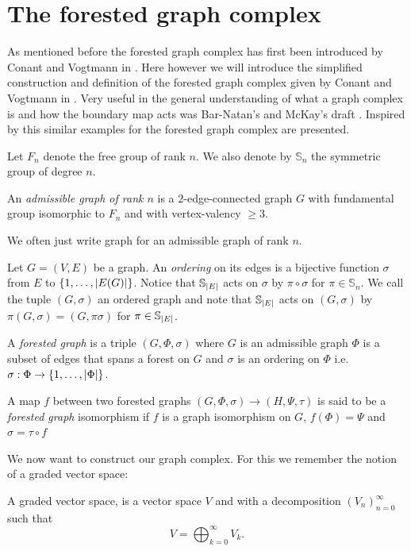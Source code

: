 \section{The forested graph complex}
As mentioned before the forested graph complex has first been introduced by Conant and Vogtmann in \cite{conant03}.
Here however we will introduce the simplified construction and definition of the forested graph complex given by Conant and Vogtmann in \cite{conant08}.
Very useful in the general understanding of  what a graph complex is and how the boundary map acts was Bar-Natan's and McKay's draft \cite{natan01}.
Inspired by this similar examples for the forested graph complex are presented.

Let $F_{n}$ denote the free group of rank $n$. We also denote by $\mathbb{S}_{n}$ the symmetric group of degree $n$.
\begin{definition}
	An \emph{admissible graph of rank $n$} is a $2$-edge-connected graph $G$ with fundamental group isomorphic to $F_{n}$ and with vertex-valency $\geq 3$.
\end{definition}

We often just write graph for an admissible graph of rank $n$.

\begin{definition}
	Let $G = (V,E)$ be a graph. An \emph{ordering} on its edges is a bijective function $\sigma$ from $E$ to $\{1,\ldots,\abs{E(G)}\}$.
	Notice that $\mathbb{S}_{\abs{E}}$ acts on $\sigma$ by $\pi \circ \sigma$ for $\pi \in \mathbb{S}_{n}$.
	We call the tuple $(G,\sigma)$ an ordered graph and note that $\mathbb{S}_{\abs{E}}$ acts on $(G,\sigma)$ by $\pi (G,\sigma) = (G,\pi \sigma)$ for $\pi \in \mathbb{S}_{\abs{E}}$.

	A \emph{forested graph} is a triple $(G,\Phi,\sigma)$ where $G$ is an admissible graph $\Phi$ is a subset of edges that spans a forest on $G$ and 
	$\sigma$ is an ordering on $\Phi$ i.e. $\sigma : \Phi \to \{1,\ldots,\abs{\Phi}\}$.

	A map $f$ between two forested graphs $(G,\Phi, \sigma) \to (H,\Psi, \tau)$ is said to be a \emph{forested graph} isomorphism if 
	$f$ is a graph isomorphism on $G$,  $f(\Phi) = \Psi$ and $\sigma = \tau \circ f $
\end{definition}

We now want to construct our graph complex. For this we remember the notion of a graded vector space:
\begin{definition}
	A graded vector space, is a vector space $V$ and with a decomposition $\left(V_{n}\right)^{\infty}_{n=0} $ such that
	\[
		V = \bigoplus_{k=0}^{\infty} V_{k}
	.\] 
\end{definition}


